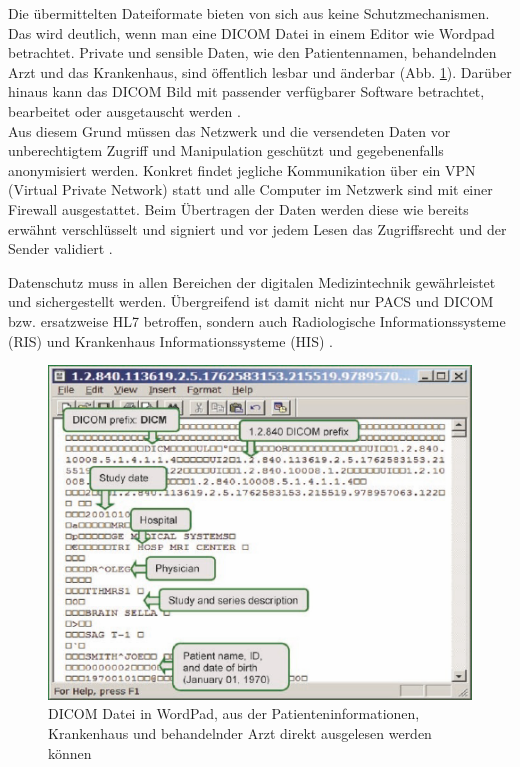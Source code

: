 Die übermittelten Dateiformate bieten von sich aus keine Schutzmechanismen. Das wird deutlich, wenn man eine DICOM Datei in einem Editor wie Wordpad betrachtet.
Private und sensible Daten, wie den Patientennamen, behandelnden Arzt und das Krankenhaus, sind öffentlich lesbar und änderbar (Abb. \ref{fig:dicom}). Darüber hinaus kann das DICOM Bild mit passender verfügbarer Software betrachtet, bearbeitet oder ausgetauscht werden \cite{DICOM}.\\
Aus diesem Grund müssen das Netzwerk und die versendeten Daten vor unberechtigtem Zugriff und Manipulation geschützt und gegebenenfalls anonymisiert werden. Konkret findet jegliche Kommunikation über ein VPN (Virtual Private Network) statt und alle Computer im Netzwerk sind mit einer Firewall ausgestattet. Beim Übertragen der Daten werden diese wie bereits erwähnt verschlüsselt und signiert und vor jedem Lesen das Zugriffsrecht und der Sender validiert \cite{DICOM}. 

Datenschutz muss in allen Bereichen der digitalen Medizintechnik gewährleistet und sichergestellt werden. Übergreifend ist damit nicht nur PACS und DICOM bzw. ersatzweise HL7 betroffen, sondern auch Radiologische Informationssysteme (RIS) und Krankenhaus Informationssysteme (HIS) \cite{DICOM}. 

\begin{figure} [H]
	\includegraphics[scale = 0.7]{Content/Pictures/DICOMEditor.png}
	\caption{DICOM Datei in WordPad, aus der Patienteninformationen, Krankenhaus und behandelnder Arzt direkt ausgelesen werden können \cite{DICOM}}
	\label{fig:dicom}
\end{figure}

